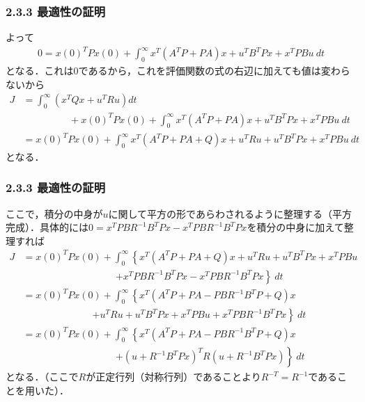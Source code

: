 \begin{frame}[t]
\frametitle{2.3.3 最適性の証明}
よって
\begin{align}
	0= x(0)^T P x(0) + \int_0^\infty x^T (A^T P + PA) x + u^T B^T P x + x^T P B u \ dt
\end{align}
となる．これは$0$であるから，これを評価関数の式の右辺に加えても値は変わらないから
\begin{align}
	J &= \int_{0}^{\infty} (x^T Q x + u^T R u) dt 
\nonumber \\ & \hspace{2cm}
		+ x(0)^T P x(0) + \int_0^\infty x^T (A^T P + PA) x + u^T B^T P x + x^T P B u \ dt
\nonumber \\
	 &= x(0)^T P x(0)
		+ \int_{0}^{\infty} x^T(A^T P + PA + Q) x 
		+ u^T R u + u^T B^T P x + x^T P B u \ dt
\end{align}
となる．
\end{frame}

\begin{frame}[t]
\frametitle{2.3.3 最適性の証明}
ここで，積分の中身が$u$に関して平方の形であらわされるように整理する（平方完成）．具体的には$0=x^T P B R^{-1} B^T P x-x^T P B R^{-1} B^T P x$を積分の中身に加えて整理すれば
\begin{align}
	J &= x(0)^T P x(0)
		+ \int_{0}^{\infty} \left \{ x^T(A^T P + PA + Q) x 
		+ u^T R u + u^T B^T P x + x^T P B u 
\right . \nonumber \\ & \hspace{4cm} \left . 
		+x^T P B R^{-1} B^T P x-x^T P B R^{-1} B^T P x \right \} \ dt
\nonumber \\
	&= x(0)^T P x(0)
		+ \int_{0}^{\infty} \left\{ x^T(A^T P + PA - P B R^{-1} B^T P + Q) x 
\right . \nonumber \\ & \hspace{3cm} \left . 
		+ u^T R u + u^T B^T P x + x^T P B u 
		+ x^T P B R^{-1} B^T P x \right\}\ dt
\nonumber \\
	&= x(0)^T P x(0)
		+ \int_{0}^{\infty} \left\{ x^T(A^T P + PA - P B R^{-1} B^T P + Q) x 
\right . \nonumber \\ & \hspace{4cm} \left . 
		+ (u + R^{-1}B^T Px)^T R (u + R^{-1}B^T Px) \right\}\ dt
\end{align}
となる．（ここで$R$が正定行列（対称行列）であることより$R^{-T}= R^{-1}$であることを用いた）．
\end{frame}

